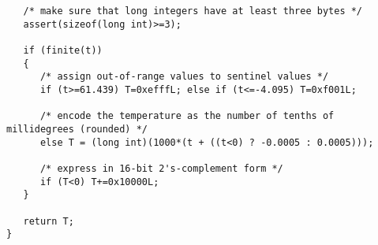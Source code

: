 {\begin{verbatim}
   /* make sure that long integers have at least three bytes */
   assert(sizeof(long int)>=3);

   if (finite(t))
   {
      /* assign out-of-range values to sentinel values */
      if (t>=61.439) T=0xefffL; else if (t<=-4.095) T=0xf001L;

      /* encode the temperature as the number of tenths of millidegrees (rounded) */
      else T = (long int)(1000*(t + ((t<0) ? -0.0005 : 0.0005)));

      /* express in 16-bit 2's-complement form */
      if (T<0) T+=0x10000L;
   }
   
   return T;
}
\end{verbatim}}

